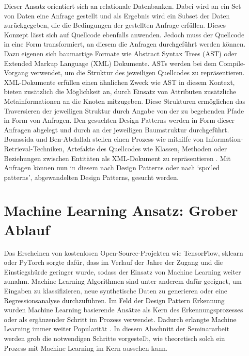 \documentclass[conference]{IEEEtran}
\begin{document}
Dieser Ansatz orientiert sich an relationale Datenbanken. Dabei wird an ein Set von Daten eine Anfrage gestellt und als Ergebnis wird ein Subset der Daten zurückgegeben, die die Bedingungen der gestellten Anfrage erfüllen. Dieses Konzept lässt sich auf Quellcode ebenfalls anwenden.
Jedoch muss der Quellcode in eine Form transformiert, an diesem die Anfragen durchgeführt werden können. Dazu eigenen sich baumartige Formate wie Abstract Syntax Trees (AST) oder Extended Markup Language (XML) Dokumente.
ASTs werden bei dem Compile-Vorgang verwendet, um die Struktur des jeweiligen Quellcodes zu repräsentieren. XML-Dokumente erfüllen einen ähnlichen Zweck wie AST in diesem Kontext,
bieten zusätzlich die Möglichkeit an, durch Einsatz von Attributen zusätzliche Metainformationen an die Knoten mitzugeben. Diese Strukturen ermöglichen das Traversieren der jeweiligen Struktur durch Angabe von der zu begehenden Pfade in Form von Anfragen.
Den gesuchten Design Patterns werden in Form dieser Anfragen abgelegt und durch an der jeweiligen Baumstruktur durchgeführt.
Bouassida und Ben-Abdallah stellen einen Prozess wie mithilfe von Information-Retrieval-Techniken, Artefakte des Quellcodes wie Klassen, Methoden oder Beziehungen zwischen Entitäten als XML-Dokument zu repräsentieren \cite{bouassida2010pattern}.
Mit Anfragen können nun in diesem nach Design Patterns oder nach `spoiled patterns', abgewandelten Design Patterns, gesucht werden.


\newpage

\section{Machine Learning Ansatz: Grober Ablauf}

Das Erscheinen von kostenlosen Open-Source-Projekten wie TensorFlow, sklearn oder PyTorch sorgte dafür, dass im Verlauf der Jahre der Zugang und die Einstiegshürde geringer wurde, sodass der Einsatz von Machine Learning
weiter zunahm. Machine Learning Algorithmen sind unter anderem dafür geeignet, um Eingaben zu klassifizieren, neue synthetische Daten zu generieren oder eine Regressionsanalyse durchzuführen. Im Feld der Design Pattern Erkennung wurden Machine Learning basierende Ansätze als Kern des Erkennungsprozesses oder als ergänzender Schritt im Prozess verwendet. Dadurch erlangte Machine Learning immer weiter Popularität \cite[p. 5805]{Yarahmadi2020}.
In diesem Abschnitt der Seminararbeit werden grob die notwendigen Schritte vorgestellt, wie theoretisch solch ein Prozess mit Machine Learning im Kern aussehen kann.
\end{document}
